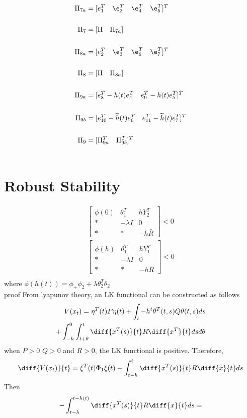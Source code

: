 \documentclass[journal]{IEEEtran}
\begin{document}
 \begin{align}
 \Pi _{7a} &= [e_1^T \quad \e_2^T \quad \e_4^T \quad \e_5^T]^T \\ \\
 \Pi _7 &= [\Pi\quad \Pi _{7a} ]\\ \\
 \Pi _{8a} &= [e_2^T \quad \e_3^T \quad \e_6^T \quad \e_7^T]^T \\ \\ 
 \Pi _8 &= [\Pi \quad \Pi _{8a} ] \\ \\
 \Pi _{9a} &= [e_8^T -h(t)e^T_4 \quad e^T_9 - h(t)e^T_5]^T \\ \\
 \Pi _{9b} &= [e_{10}^T -\widetilde{h}(t)e^T_6 \quad e^T_{11} - \widetilde{h}(t)e^T_7]^T \\ \\
 \Pi _{9} &= [\Pi _{9a}^T \quad \Pi _{9b}^T]^T \\ \\
 \end{align}
 
\section{Robust Stability}
  \begin{align}
  \begin{bmatrix}
     \phi(0)&\theta _1^T&hY_2^T\\
     *&-\lambda I&0\\
     *& * & -h\bar{R}
   \end{bmatrix} < 0 \\
  \begin{bmatrix} \\
     \phi(h)&\theta _1^T&hY_1^T\\
     *&-\lambda I&0\\
     *& * & -h\bar{R}
   \end{bmatrix} < 0 \\
 \end{align}
where $\phi(h(t))=\phi _+ \phi _2 + \lambda \theta _2^T \theta _2$   
\\
proof
From lyapunov theory, an LK functional can be constructed as follows
\begin{align}
  V(x_t) = \eta ^T (t)P \eta(t) + \int _t-h^t \theta ^T(t,s)Q\theta(t,s)ds  \\ +\int _{-h} ^0 \int _{t+\theta}^t\diff{x^T(s)}{t}R\diff{x^T}{t}dsd\theta
\end{align}
when $P>0$ $Q> 0$ and $R>0$, the LK functional is positive. 
Therefore,
\begin{equation}
  \diff{V(x_t)}{t}= \xi ^T (t)\Phi _1 \xi (t) - \int _{t-h}^t \diff{x^T(s)}{t}R\diff{x}{t} ds
\end{equation}
Then 
 \begin{equation}
   - \int ^{t-h(t)}_{t-h}\diff{x^T(s)}{t}R\diff{x}{t}ds =
 \end{equation}
\end{document}
